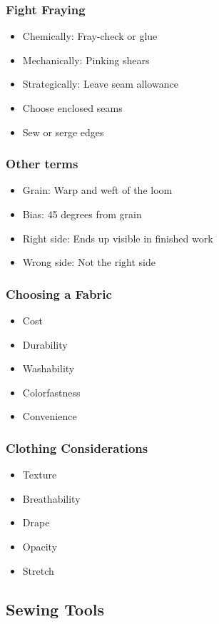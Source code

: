 \documentclass{beamer}
\begin{document}
\begin{frame}[fragile]
\frametitle{Fight Fraying}
\begin{itemize}[<+(1)->]
\item Chemically: Fray-check or glue
\item Mechanically: Pinking shears
\item Strategically: Leave seam allowance
\item Choose enclosed seams
\item Sew or serge edges
\end{itemize}
\end{frame}

\begin{frame}[fragile]
\frametitle{Other terms}
\begin{itemize}[<+(1)->]
\item Grain: Warp and weft of the loom
\item Bias: 45 degrees from grain
\item Right side: Ends up visible in finished work
\item Wrong side: Not the right side
\end{itemize}
\end{frame}

\begin{frame}[fragile]
\frametitle{Choosing a Fabric}
\begin{itemize}[<+(1)->]
\item Cost
\item Durability
\item Washability
\item Colorfastness
\item Convenience
\end{itemize}
\end{frame}

\begin{frame}[fragile]
\frametitle{Clothing Considerations}
\begin{itemize}[<+(1)->]
\item Texture
\item Breathability
\item Drape
\item Opacity
\item Stretch
\end{itemize}
\end{frame}

\subsection{Sewing Tools}
\end{document}

